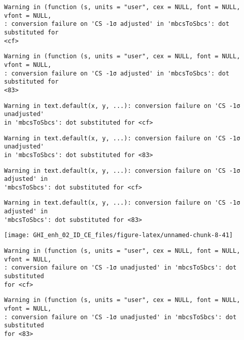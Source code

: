 \documentclass[
  10pt,
  a4paper,oneside]{article}
\begin{document}
\begin{verbatim}
Warning in (function (s, units = "user", cex = NULL, font = NULL, vfont = NULL,
: conversion failure on 'CS -1σ adjusted' in 'mbcsToSbcs': dot substituted for
<cf>
\end{verbatim}

\begin{verbatim}
Warning in (function (s, units = "user", cex = NULL, font = NULL, vfont = NULL,
: conversion failure on 'CS -1σ adjusted' in 'mbcsToSbcs': dot substituted for
<83>
\end{verbatim}

\begin{verbatim}
Warning in text.default(x, y, ...): conversion failure on 'CS -1σ unadjusted'
in 'mbcsToSbcs': dot substituted for <cf>
\end{verbatim}

\begin{verbatim}
Warning in text.default(x, y, ...): conversion failure on 'CS -1σ unadjusted'
in 'mbcsToSbcs': dot substituted for <83>
\end{verbatim}

\begin{verbatim}
Warning in text.default(x, y, ...): conversion failure on 'CS -1σ adjusted' in
'mbcsToSbcs': dot substituted for <cf>
\end{verbatim}

\begin{verbatim}
Warning in text.default(x, y, ...): conversion failure on 'CS -1σ adjusted' in
'mbcsToSbcs': dot substituted for <83>
\end{verbatim}

\begin{center}\texttt{[image: GHI\_enh\_02\_ID\_CE\_files/figure-latex/unnamed-chunk-8-41]} \end{center}

\begin{verbatim}
Warning in (function (s, units = "user", cex = NULL, font = NULL, vfont = NULL,
: conversion failure on 'CS -1σ unadjusted' in 'mbcsToSbcs': dot substituted
for <cf>
\end{verbatim}

\begin{verbatim}
Warning in (function (s, units = "user", cex = NULL, font = NULL, vfont = NULL,
: conversion failure on 'CS -1σ unadjusted' in 'mbcsToSbcs': dot substituted
for <83>
\end{verbatim}
\end{document}

